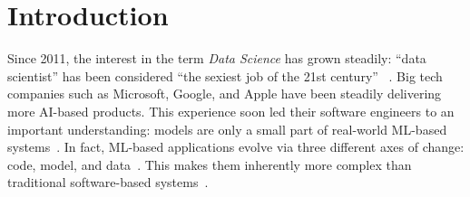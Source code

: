 
\chapter{Introduction}
\label{chap:introduction}


Since 2011, the interest in the term \emph{Data Science} has grown steadily:
``data scientist'' has been considered ``the sexiest job of the 21st century''%
~\parencite{Cao2018DataScience,Davenport2012DataCentury}. Big tech companies
such as Microsoft, Google, and Apple have been steadily delivering more
AI-based products. This experience soon led their software engineers to
an important understanding: models are only a small part of real-world
ML-based systems~\parencite{Hulten2018BuildingEngineering,Sculley2015HiddenSystems}.
In fact, ML-based applications evolve via three different axes of change:
code, model, and data~\parencite{Alves2024PracticesReview,Sato2019ContinuousLearning}.
This makes them inherently more complex than traditional software-based
systems~\parencite{Diaz-De-Arcaya2023ASurvey, Giray2021AChallenges,
Granlund2021MLOpsCases}.

